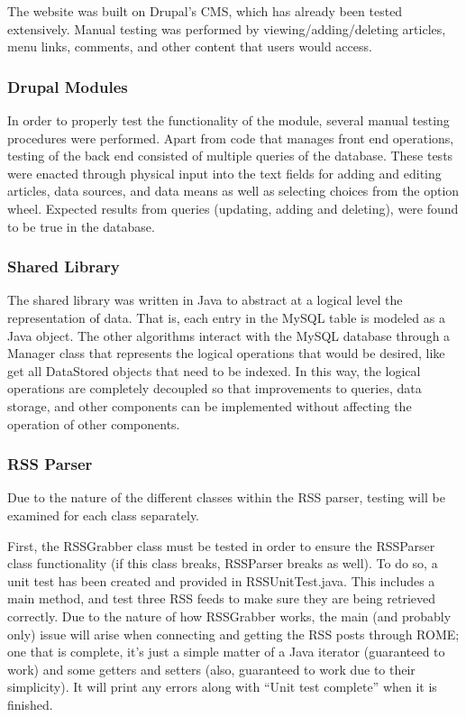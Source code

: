 \documentclass[11pt]{article} %
\begin{document}
The website was built on Drupal’s CMS, which has already been tested extensively. Manual testing was performed by viewing/adding/deleting articles, menu links, comments, and other content that users would access.

\subsubsection{Drupal Modules}

In order to properly test the functionality of the module, several manual testing procedures were performed. Apart from code that manages front end operations, testing of the back end consisted of multiple queries of the database. These tests were enacted through physical input into the text fields for adding and editing articles, data sources, and data means as well as selecting choices from the option wheel. Expected results from queries (updating, adding and deleting), were found to be true in the database. 

\subsubsection{Shared Library}

The shared library was written in Java to abstract at a logical level the representation of data. That is, each entry in the MySQL table is modeled as a Java object. The other algorithms interact with the MySQL database through a Manager class that represents the logical operations that would be desired, like get all DataStored objects that need to be indexed. In this way, the logical operations are completely decoupled so that improvements to queries, data storage, and other components can be implemented without affecting the operation of other components.

\subsubsection{RSS Parser}

Due to the nature of the different classes within the RSS parser, testing will be examined for each class separately.

First, the RSSGrabber class must be tested in order to ensure the RSSParser class functionality (if this class breaks, RSSParser breaks as well). To do so, a unit test has been created and provided in RSSUnitTest.java. This includes a main method, and test three RSS feeds to make sure they are being retrieved correctly. Due to the nature of how RSSGrabber works, the main (and probably only) issue will arise when connecting and getting the RSS posts through ROME; one that is complete, it’s just a simple matter of a Java iterator (guaranteed to work) and some getters and setters (also, guaranteed to work due to their simplicity). It will print any errors along with “Unit test complete” when it is finished.
\end{document}
